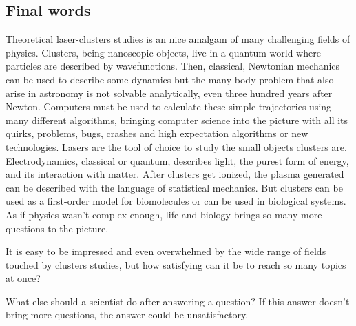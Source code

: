 \subsection{Final words}

Theoretical laser-clusters studies is an nice amalgam of many challenging
fields of physics. Clusters, being nanoscopic objects, live in a quantum world
where particles are described by wavefunctions. Then, classical, Newtonian
mechanics can be used to describe some dynamics but the many-body problem that
also arise in astronomy is not solvable analytically, even three hundred years
after Newton. Computers must be used to calculate these simple trajectories
using many different algorithms, bringing computer science into the picture
with all its quirks, problems, bugs, crashes and high expectation algorithms or
new technologies. Lasers are the tool of choice to study the small objects
clusters are. Electrodynamics, classical or quantum, describes light, the purest
form of energy, and its interaction with matter. After clusters get ionized,
the plasma generated can be described with the language of statistical mechanics.
But clusters can be used as a first-order model for biomolecules or can be used
in biological systems. As if physics wasn't complex enough, life and biology
brings so many more questions to the picture.

It is easy to be impressed and even overwhelmed by the wide range of fields
touched by clusters studies, but how satisfying can it be to reach so many
topics at once?

What else should a scientist do
after answering a question? If this answer doesn't bring more questions, the
answer could be unsatisfactory.
